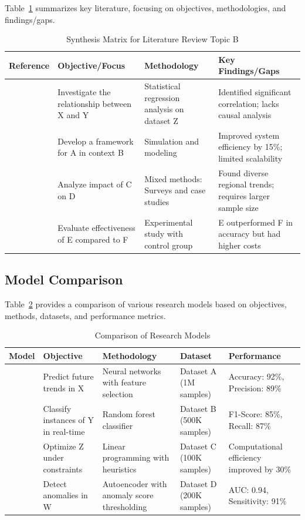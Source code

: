 \documentclass[conference]{IEEEtran}
\begin{document}
Table~\ref{tab:synthesis_matrix} summarizes key literature, focusing on objectives, methodologies, and findings/gaps.

\begin{table}[htbp]
	\caption{Synthesis Matrix for Literature Review Topic B}
	\label{tab:synthesis_matrix}
	\centering
	\renewcommand{\arraystretch}{1.2} %
	\begin{tabularx}{\linewidth}{|X|X|X|X|}
		\hline
		\textbf{Reference} & \textbf{Objective/Focus} & \textbf{Methodology} & \textbf{Key Findings/Gaps} \\ \hline
		\textcite{ref1} & Investigate the relationship between X and Y & Statistical regression analysis on dataset Z & Identified significant correlation; lacks causal analysis \\ \hline
		\textcite{ref2} & Develop a framework for A in context B & Simulation and modeling & Improved system efficiency by 15\%; limited scalability \\ \hline
		\textcite{ref3} & Analyze impact of C on D & Mixed methods: Surveys and case studies & Found diverse regional trends; requires larger sample size \\ \hline
		\textcite{ref4} & Evaluate effectiveness of E compared to F & Experimental study with control group & E outperformed F in accuracy but had higher costs \\ \hline
	\end{tabularx}
\end{table}


\subsection{Model Comparison}

Table~\ref{tab:model_comparison} provides a comparison of various research models based on objectives, methods, datasets, and performance metrics.

\begin{table}[htbp]
	\caption{Comparison of Research Models}
	\label{tab:model_comparison}
	\centering
	\renewcommand{\arraystretch}{1.2} %
	\begin{tabularx}{\linewidth}{|X|X|X|X|X|}
		\hline
		\textbf{Model} & \textbf{Objective} & \textbf{Methodology} & \textbf{Dataset} & \textbf{Performance} \\ \hline
		\textcite{model1} & Predict future trends in X & Neural networks with feature selection & Dataset A (1M samples) & Accuracy: 92\%, Precision: 89\% \\ \hline
		\textcite{model2} & Classify instances of Y in real-time & Random forest classifier & Dataset B (500K samples) & F1-Score: 85\%, Recall: 87\% \\ \hline
		\textcite{model3} & Optimize Z under constraints & Linear programming with heuristics & Dataset C (100K samples) & Computational efficiency improved by 30\% \\ \hline
		\textcite{model4} & Detect anomalies in W & Autoencoder with anomaly score thresholding & Dataset D (200K samples) & AUC: 0.94, Sensitivity: 91\% \\ \hline
	\end{tabularx}
\end{table}
\end{document}
